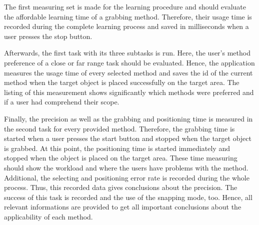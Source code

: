 The first measuring set is made for the learning procedure and should evaluate the affordable learning time of a grabbing method. Therefore, their usage time is recorded during the complete learning process and saved in milliseconds when a user presses the stop button. 

Afterwards, the first task with its three subtasks is run. Here, the user's method preference of a close or far range task should be evaluated. Hence, the application measures the usage time of every selected method and saves the id of the current method when the target object is placed successfully on the target area. The listing of this measurement shows significantly which methods were preferred and if a user had comprehend their scope.  

Finally, the precision as well as the grabbing and positioning time is measured in the second task for every provided method. Therefore, the grabbing time is started when a user presses the start button and stopped when the target object is grabbed. At this point, the positioning time is started immediately and stopped when the object is placed on the target area. These time measuring should show the workload and where the users have problems with the method. Additional, the selecting and positioning error rate is recorded during the whole process. Thus, this recorded data gives conclusions about the precision. The success of this task is recorded and the use of the snapping mode, too. Hence, all relevant informations are provided to get all important conclusions about the applicability of each method. 


\newpage